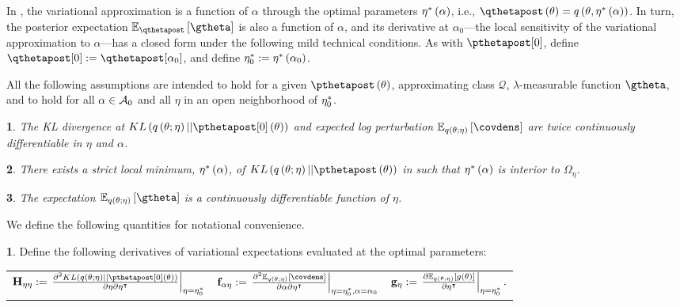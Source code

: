 \documentclass{article}\usepackage[]{graphicx}\usepackage[]{color}
\providecommand{\tabularnewline}{\\}
\theoremstyle{definition}
\newtheorem{defn}{\protect\definitionname}
\theoremstyle{plain}
\newtheorem{assumption}{\protect\assumptionname}
\theoremstyle{plain}
\theoremstyle{plain}
\theoremstyle{definition}
\theoremstyle{plain}
\theoremstyle{plain}
\providecommand{\assumptionname}{Assumption}
\providecommand{\definitionname}{Definition}
\begin{document}
In , the variational approximation is
a function of $\alpha$ through the optimal parameters $\eta^{*}\left(\alpha\right)$,
i.e., $\qthetapost\left(\theta\right)=q\left(\theta,\etatopt\right)$.
In turn, the posterior expectation $\mbe_{\qthetapost}\left[\gtheta\right]$
is also a function of $\alpha$, and its derivative at
$\alpha_{0}$---the local sensitivity of the variational approximation
to $\alpha$---has a closed form under the following mild technical
conditions. As with $\pzeropost$, define $\qzeropost:=\qthetapost[\alpha_{0}]$,
and define $\eta_{0}^{*}:=\eta^{*}\left(\alpha_{0}\right)$.

All the following assumptions are intended to hold for a given $\pthetapost\left(\theta\right)$,
approximating class $\mathcal{Q}$, $\lambda$-measurable function
$\gtheta$, and to hold for all $\alpha\in\mathcal{A}_{0}$ and all
$\eta$ in an open neighborhood of $\eta_{0}^{*}$.
\begin{assumption}
\label{assu:kl_differentiable}The KL divergence at $KL\left(q\left(\theta;\eta\right)||\pzeropost\left(\theta\right)\right)$
and expected log perturbation $\mbe_{q\left(\theta;\eta\right)}\left[\covdens\right]$
are twice continuously differentiable in $\eta$ and $\alpha$.
\end{assumption}
\begin{assumption}
\label{assu:opt_interior}There exists a strict local minimum, $\eta^{*}\left(\alpha\right)$,
of $KL\left(q\left(\theta;\eta\right)||\pthetapost\left(\theta\right)\right)$
in  such that $\eta^{*}\left(\alpha\right)$ is interior
to $\Omega_{\eta}$.
\end{assumption}
\begin{assumption}
\label{assu:e_q_g_smooth}The expectation $\mbe_{q\left(\theta;\eta\right)}\left[\gtheta\right]$
is a continuously differentiable function of $\eta$.
\end{assumption}
We define the following quantities for notational convenience.
\begin{defn}
\label{def:vb_derivatives}Define the following derivatives of variational
expectations evaluated at the optimal parameters:

\begin{tabular}{ccc}
$\klhess :=
    \left.\frac{\partial^{2}KL\left(q\left(\theta;\eta\right)||
        \pzeropost\left(\theta\right)\right)}{\partial\eta\partial\eta^{\trans}}
            \right|_{\eta=\etaoptzero}$ &
$\efhess:=
    \left.\frac{\partial^2\mbe_{q\left(\theta;\eta\right)}\left[\covdens\right]}
    {\partial\alpha\partial\eta^{\trans}}
    \right|_{\eta=\etaoptzero,\alpha=\alpha_{0}}$ &
$\mathbf{g}_{\eta}:=
    \left.\frac{\partial\mathbb{E}_{q\left(\theta;\eta\right)}
    \left[g\left(\theta\right)\right]}{\partial\eta^{\intercal}}
    \right|_{\eta=\eta_{0}^{*}}.$\tabularnewline
\end{tabular}
\end{defn}
\end{document}
